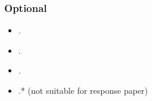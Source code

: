 \documentclass[abstract=on,parskip=full,headings=standardclasses,fontsize=11pt,paper=a4]{scrartcl}
\begin{document}
\subsubsection*{Optional}
\begin{itemize}
\item {}.
\item {}.
\item {}.
\item {}.* (not suitable for response paper)
\end{itemize}


\sloppy
\renewcommand*{\bibfont}{\small}

\setlength{\bibitemsep}{0.2em} %
\printbibliography
\end{document}
